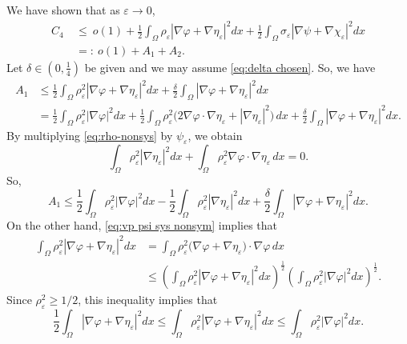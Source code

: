 \documentclass[a4paper,10pt,reqno]{amsart}
\theoremstyle{definition}
\newcommand{\ve}{{\varepsilon}}
\newcommand{\vp}{{\varphi}}
\newcommand{\Om}{{\Omega}}
\numberwithin{equation}{section}
\begin{document}
We have shown that as $\ve \to 0$,
\begin{equation}\label{eq:A1 A2 nonsym}
\begin{aligned}
C_4 ~&\le ~  o(1) + \frac{1}{2}\int_\Omega  \rho_\varepsilon  | \nabla \varphi+\nabla \eta_\varepsilon|^2 dx + \frac{1}{2}\int_\Omega
 \sigma_\varepsilon  |\nabla \psi+\nabla \chi_\varepsilon |^2 dx \\
&=:~ o(1)+A_1+A_2.
\end{aligned}
\end{equation}
Let     $\delta \in (0,\frac14)$ be given and we may assume \eqref{eq:delta chosen}.
So, we have
\begin{align*}
 A_1&  \le \frac{1}{2}\int_\Omega  \rho_\varepsilon^2   | \nabla \varphi+\nabla \eta_\varepsilon|^2 dx +  \frac{\delta}{2}\int_\Omega     | \nabla \varphi+\nabla \eta_\varepsilon|^2 dx\\
 &=  \frac{1}{2}\int_\Omega  \rho_\varepsilon^2   |\nabla \vp|^2 dx +   \frac{1}{2}\int_\Omega  \rho_\varepsilon^2  \big( 2  \nabla \vp \cdot \nabla \eta_\varepsilon +    |\nabla \eta_\varepsilon |^2 \big) \,dx +  \frac{\delta}{2}\int_\Omega     |\nabla \vp +\nabla \eta_\ve|^2 dx.
\end{align*}
By multiplying \eqref{eq:rho-nonsys} by $\psi_\ve$, we obtain
\begin{equation}\label{eq:vp psi sys nonsym}
\int_\Om \rho_\ve^2 |\nabla \eta_\ve|^2 dx+  \int_\Om \rho_\ve^2 \nabla  \vp \cdot \nabla \eta_\ve \,dx=0.
\end{equation}
So,
\begin{equation}\label{eq:A1 ineq 3}
A_1    \le  \frac{1}{2}\int_\Omega  \rho_\varepsilon^2   |\nabla \vp|^2 dx -   \frac{1}{2}\int_\Omega  \rho_\varepsilon^2 |\nabla \eta_\ve|^2dx   +  \frac{\delta}{2}\int_\Omega     | \nabla \vp +\nabla \eta_\varepsilon|^2 dx.
\end{equation}
On the other hand, \eqref{eq:vp psi sys nonsym} implies that
\begin{align*}
\int_\Om \rho_\ve^2 |\nabla \vp +\nabla \eta_\ve|^2 dx &= \int_\Om \rho_\ve^2 \big(\nabla \vp +\nabla \eta_\ve \big) \cdot \nabla \vp  \, dx \\
&\le  \left( \int_\Omega  \rho_\varepsilon^2  |\nabla \vp+\nabla \eta_\ve|^2dx \right)^{\frac12}  \left( \int_\Omega  \rho_\varepsilon^2  |\nabla \vp|^2dx \right)^{\frac12}.
\end{align*}
Since $\rho_\ve^2\ge 1/2$, this inequality implies that
\[ \frac12  \int_\Om |\nabla \vp +\nabla \eta_\ve|^2 dx \le \int_\Om \rho_\ve^2 |\nabla \vp +\nabla \eta_\ve|^2 dx \le \int_\Omega  \rho_\varepsilon^2  |\nabla \vp|^2dx.
\]
\end{document}
